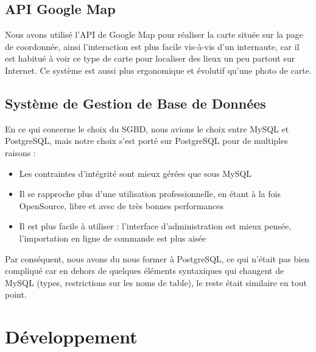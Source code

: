 \documentclass[11pt]{report}
\begin{document}
\subsection{API Google Map}
Nous avons utilisé l'API de Google Map pour réaliser la carte située sur la page
de coordonnée, ainsi l'interaction est plus facile vis-à-vis d'un internaute,
car il est habitué à voir ce type de carte pour localiser des lieux un peu
partout sur Internet. Ce système est aussi plus ergonomique et évolutif qu'une
photo de carte.

\subsection{Système de Gestion de Base de Données}
En ce qui concerne le choix du SGBD, nous avions le choix entre MySQL et
PostgreSQL, mais notre choix s'est porté sur PostgreSQL pour de multiples
raisons : \\
\begin{itemize}
\item Les contraintes d'intégrité sont mieux gérées que sous MySQL
\item Il se rapproche plus d'une utilisation professionnelle, en étant à la
fois OpenSource, libre et avec de très bonnes performances
\item Il est plus facile à utiliser : l'interface d'administration est mieux
pensée, l'importation en ligne de commande est plus aisée \\
\end{itemize}

\par Par conséquent, nous avons du nous former à PostgreSQL, ce qui n'était pas
bien compliqué car en dehors de quelques éléments syntaxiques qui changent de
MySQL (types, restrictions sur les noms de table), le reste était similaire en 
tout point.

\section{Développement}
\end{document}
